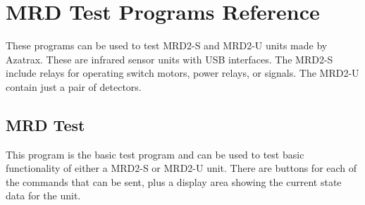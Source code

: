 
\chapter{MRD Test Programs Reference}
\label{chpt:mrdtest:Reference}

These programs can be used to test MRD2-S and MRD2-U units made by
Azatrax. These are infrared sensor units with USB interfaces.  The
MRD2-S include relays for operating switch motors, power relays, or
signals. The MRD2-U contain just a pair of detectors.

\section{MRD Test}

This program is the basic test program and can be used to test basic
functionality of either a MRD2-S or MRD2-U unit.  There are buttons for
each of the commands that can be sent, plus a display area showing the
current state data for the unit.

